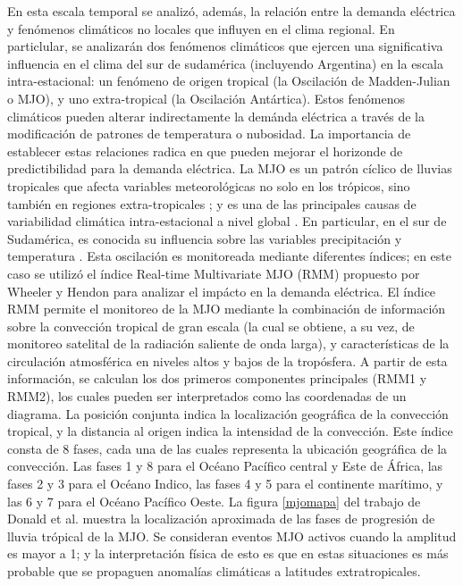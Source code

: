 \documentclass[11pt,a4paper]{article}
\begin{document}
En esta escala temporal se analizó, además, la relación entre la demanda eléctrica y fenómenos climáticos no locales que influyen en el clima regional. En particlular, se analizarán dos fenómenos climáticos que ejercen una significativa influencia en el clima del sur de sudamérica (incluyendo Argentina) en la escala intra-estacional: un fenómeno de origen tropical (la Oscilación de Madden-Julian o MJO), y uno extra-tropical (la Oscilación Antártica). Estos fenómenos climáticos pueden alterar indirectamente la demánda eléctrica a través de la modificación de patrones de temperatura o nubosidad. La importancia de establecer estas relaciones radica en que pueden mejorar el horizonde de predictibilidad \cite{kim2018prediction} para la demanda eléctrica. La MJO es un patrón cíclico de lluvias tropicales \cite{zhang2005madden, kim2018prediction} que afecta variables meteorológicas no solo en los trópicos, sino también en regiones extra-tropicales \cite{donald2006near}; y es una de las principales causas de variabilidad climática intra-estacional a nivel global \cite{zhang2005madden, zhang2013madden, schreck2021global} . En particular, en el sur de Sudamérica, es conocida su influencia sobre las variables precipitación y temperatura \cite{alvarez2016influence,ungerovich2021influence,jacques2021intraseasonal}. Esta oscilación es monitoreada mediante diferentes índices; en este caso se utilizó el índice Real-time Multivariate MJO (RMM) propuesto por Wheeler y Hendon \cite{wheeler2004all} para analizar el impácto en la demanda eléctrica. El índice RMM permite el monitoreo de la MJO mediante la combinación de información sobre la convección tropical de gran escala (la cual se obtiene, a su vez, de monitoreo satelital de la radiación saliente de onda larga), y características de la circulación atmosférica en niveles altos y bajos de la tropósfera. A partir de esta información, se calculan los dos primeros componentes principales (RMM1 y RMM2), los cuales pueden ser interpretados como las coordenadas de un diagrama. La posición conjunta indica la localización geográfica de la convección tropical, y la distancia al origen indica la intensidad de la convección. Este índice consta de 8 fases, cada una de las cuales representa la ubicación geográfica de la convección. Las fases 1 y 8 para el Océano Pacífico central y Este de África, las fases 2 y 3 para el Océano Indico, las fases 4 y 5 para el continente marítimo, y las 6 y 7 para el Océano Pacífico Oeste. La figura \ref{mjomapa} del trabajo de Donald et al. \cite{donald2004forecasting} muestra la localización aproximada de las fases de progresión de lluvia trópical de la MJO. Se consideran eventos MJO activos cuando la amplitud es mayor a 1; y la interpretación física de esto es que en estas situaciones es más probable que se propaguen anomalías climáticas a latitudes extratropicales. 
\end{document}
